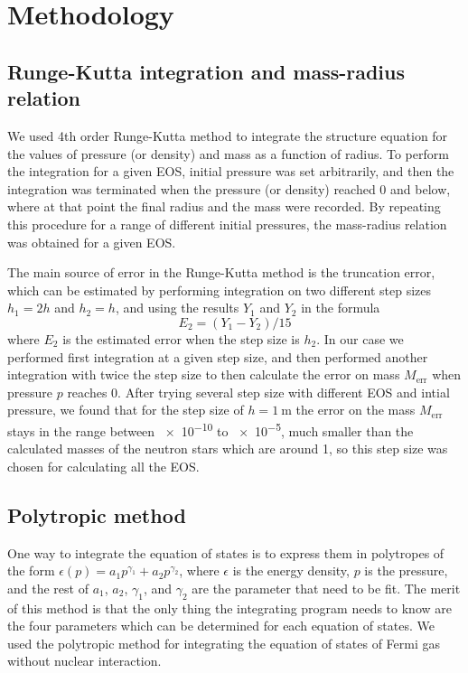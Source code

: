 \documentclass[draft,11pt]{article}
\theoremstyle{definition}
\theoremstyle{remark}
\begin{document}
    \section{Methodology}
        \subsection{Runge-Kutta integration and mass-radius relation}
            We used 4th order Runge-Kutta method to integrate the structure equation for the values of pressure (or density) and mass as a function of radius. To perform the integration for a given EOS, initial pressure was set arbitrarily, and then the integration was terminated when the pressure (or density) reached 0 and below, where at that point the final radius and the mass were recorded. By repeating this procedure for a range of different initial pressures, the mass-radius relation was obtained for a given EOS.
            
            The main source of error in the Runge-Kutta method is the truncation error, which can be estimated by performing integration on two different step sizes $h_1=2h$ and $h_2=h$, and using the results $Y_1$ and $Y_2$ in the formula  \parencite{lotkin.1951/rk.accuracy} \[E_2=(Y_1-Y_2)/15\] where $E_2$ is the estimated error when the step size is $h_2$. In our case we performed first integration at a given step size, and then performed another integration with twice the step size to then calculate the error on mass $M_{\text{err}}$ when pressure $p$ reaches 0. After trying several step size with different EOS and intial pressure, we found that for the step size of $h=\SI{1}{\meter}$ the error on the mass $M_{\text{err}}$ stays in the range between \SI{e-10}{\solarmass} to \SI{e-5}{\solarmass}, much smaller than the calculated masses of the neutron stars which are around \SI{1}{\solarmass}, so this step size was chosen for calculating all the EOS.
        
        \subsection{Polytropic method}
            One way to integrate the equation of states is to express them in polytropes of the form $\epsilon(p) = a_1 p^{\gamma_1} + a_2 p^{\gamma_2}$, where $\epsilon$ is the energy density, $p$ is the pressure, and the rest of $a_1$, $a_2$, $\gamma_1$, and $\gamma_2$ are the parameter that need to be fit. The merit of this method is that the only thing the integrating program needs to know are the four parameters which can be determined for each equation of states. We used the polytropic method for integrating the equation of states of Fermi gas without nuclear interaction.
\end{document}
